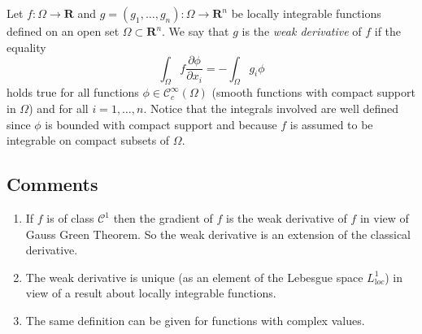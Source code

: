 \documentclass[12pt]{article}
\newcommand{\R}{\mathbf R}
\begin{document}
Let $f\colon \Omega\to \R$ and $g=(g_1,\ldots,g_n)\colon \Omega\to \R^n$ be locally integrable 
functions defined on an open set $\Omega\subset \mathbf R^n$.
We say that $g$ is the \emph{weak derivative} of $f$ if the equality
\[
  \int_\Omega f \frac{\partial \phi}{\partial x_i} = - \int_\Omega g_i \phi
\]
holds true for all functions $\phi\in\mathcal C^\infty_c(\Omega)$ (smooth functions with compact support in $\Omega$) and for all $i=1,\ldots, n$. Notice that the integrals involved are well defined since $\phi$ is bounded with compact support and because $f$ is assumed to be integrable on compact subsets of $\Omega$.

\subsection*{Comments}
\begin{enumerate}
\item
If $f$ is of class $\mathcal C^1$ then the gradient of $f$ is the weak derivative of $f$ in view of Gauss Green Theorem. So the weak derivative is an extension of the classical derivative. 
\item
The weak derivative is unique (as an element of the Lebesgue space $L^1_{\mathrm loc}$) in view of a result about locally integrable functions.
\item
The same definition can be given for functions with complex values.
\end{enumerate}
\end{document}
